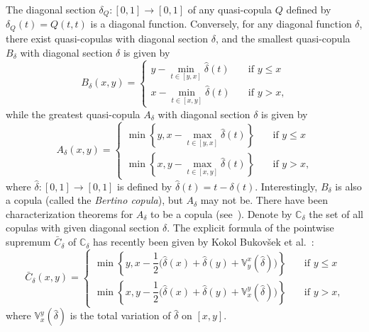 \documentclass[12pt]{article}
\theoremstyle{plain}
\theoremstyle{definition}
\begin{document}
The diagonal section $\delta_Q: [0, 1]\to [0, 1]$ of any quasi-copula $Q$ defined by $\delta_Q(t)=Q(t, t)$ is a diagonal function. Conversely, for any diagonal function $\delta$, there exist quasi-copulas with diagonal section $\delta$,
and the smallest quasi-copula $B_\delta$ with diagonal section $\delta$ is given by
\[
B_\delta(x, y) =\left \{
        \begin {array}{ll}
         y-\min\limits_{t\in[y, x]}\hat{\delta}(t)
                  &\quad \text{if\ \ $y\leq x$}  \\[2mm]
           x-\min\limits_{t\in[x, y]}\hat{\delta}(t)
                  &\quad \text{if\ \ $y>x$,}
        \end {array}
       \right.
\]
while the greatest quasi-copula $A_\delta$ with diagonal section $\delta$ is given by
\[
A_\delta(x, y) =\left \{
        \begin {array}{ll}
         \min\left\{y, x-\max\limits_{t\in[y, x]}\hat{\delta}(t)\right\}
                  &\quad \text{if\ \ $y\leq x$}  \\[2mm]
           \min\left\{x, y-\max\limits_{t\in[x, y]}\hat{\delta}(t)\right\}
                  &\quad \text{if\ \ $y>x$,}
        \end {array}
       \right.
\]
where $\hat{\delta}: [0, 1]\to [0, 1]$ is defined by $\hat{\delta}(t)=t-\delta(t)$.
Interestingly, $B_\delta$ is also a copula (called the \emph{Bertino copula}), but $A_\delta$ may not be.
There have been characterization theorems for $A_\delta$ to be a copula (see~\cite{NQRU04, NQRU08}).
Denote by $\mathbb{C}_\delta$ the set of all copulas with given diagonal section $\delta$. The explicit formula of the pointwise supremum $\bar{C}_\delta$ of $\mathbb{C}_\delta$ has recently been given by Kokol Bukov\v{s}ek et al.~\cite{KMS24}:
\[
\bar{C}_\delta(x, y)=\left \{
        \begin {array}{ll}
         \min\left\{y, x-\dfrac{1}{2}\Big(\hat{\delta}(x)+\hat{\delta}(y)+\mathbb{V}_{y}^{x}(\hat{\delta})\Big)\right\}
                  &\quad \text{if\ \ $y\leq x$}  \\[2mm]
           \min\left\{x, y-\dfrac{1}{2}\Big(\hat{\delta}(x)+\hat{\delta}(y)+\mathbb{V}_{x}^{y}(\hat{\delta})\Big)\right\}
                  &\quad \text{if\ \ $y>x$,}
        \end {array}
       \right.
\]
where $\mathbb{V}_{x}^{y}(\hat{\delta})$ is the total variation of $\hat{\delta}$ on $[x, y]$.
\end{document}
